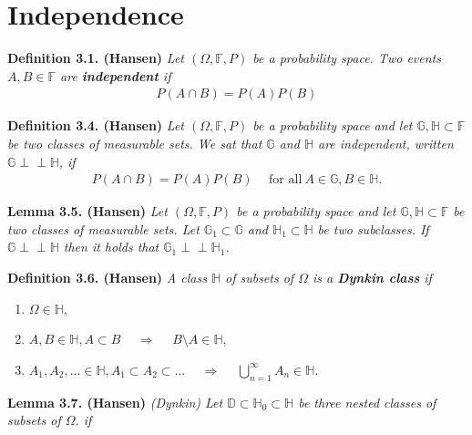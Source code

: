 \documentclass[a4paper,12pt,openany]{book}
\providecommand{\tightlist}{%
 \setlength{\itemsep}{0pt}\setlength{\parskip}{0pt}}
\begin{document}
\hypertarget{independence}{%
\section{Independence}\label{independence}}

\textbf{Definition 3.1. (Hansen)} \emph{Let \((\Omega,\mathbb{F},P)\) be a probability space. Two events \(A,B\in\mathbb{F}\) are \textbf{independent} if}
\begin{align*}
    P(A\cap B)=P(A)P(B)\tag{3.1}
\end{align*}

\textbf{Definition 3.4. (Hansen)} \emph{Let \((\Omega,\mathbb{F},P)\) be a probability space and let \(\mathbb{G},\mathbb{H}\subset \mathbb{F}\) be two classes of measurable sets. We sat that \(\mathbb{G}\) and \(\mathbb{H}\) are independent, written \(\mathbb{G}\perp \!\!\! \perp\mathbb{H}\), if}
\begin{align*}
    P(A\cap B)=P(A)P(B)\hspace{15pt}\text{for all}\ A\in\mathbb{G},B\in\mathbb{H}.\tag{3.2}
\end{align*}

\textbf{Lemma 3.5. (Hansen)} \emph{Let \((\Omega,\mathbb{F},P)\) be a probability space and let \(\mathbb{G},\mathbb{H}\subset \mathbb{F}\) be two classes of measurable sets. Let \(\mathbb{G}_1\subset \mathbb{G}\) and \(\mathbb{H}_1\subset\mathbb{H}\) be two subclasses. If \(\mathbb{G}\perp \!\!\! \perp \mathbb{H}\) then it holds that \(\mathbb{G}_1\perp \!\!\! \perp \mathbb{H}_1\).}

\textbf{Definition 3.6. (Hansen)} \emph{A class \(\mathbb{H}\) of subsets of \(\Omega\) is a \textbf{Dynkin class} if}

\begin{enumerate}
\def\labelenumi{\arabic{enumi}.}
\tightlist
\item
  \(\Omega \in\mathbb{H}\),
\item
  \(A,B\in\mathbb{H},A\subset B\hspace{15pt}\Rightarrow\hspace{15pt}B\setminus A\in\mathbb{H}\),
\item
  \(A_1,A_2,...\in\mathbb{H},A_1\subset A_2\subset ...\hspace{15pt}\Rightarrow\hspace{15pt}\bigcup_{n=1}^\infty A_n\in\mathbb{H}\).
\end{enumerate}

\textbf{Lemma 3.7. (Hansen)} \emph{(Dynkin) Let \(\mathbb{D}\subset \mathbb{H}_0\subset \mathbb{H}\) be three nested classes of subsets of \(\Omega\). if}
\end{document}
